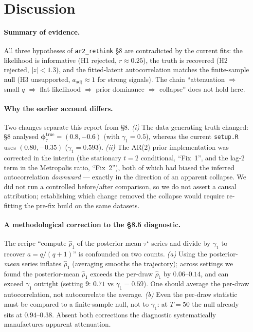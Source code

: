 \documentclass[11pt]{article}
\theoremstyle{definition}
\newcommand{\phitau}{\bm{\phi}_\tau}
\newcommand{\code}[1]{\texttt{#1}}
\begin{document}
\section{Discussion}
\label{sec:discussion}

\paragraph{Summary of evidence.} All three hypotheses of \code{ar2\_rethink}
\S8 are contradicted by the current fits: the likelihood is informative (H1
rejected, $r\approx0.25$), the truth is recovered (H2 rejected, $|z|<1.3$), and
the fitted-latent autocorrelation matches the finite-sample null (H3
unsupported, $a_{\text{adj}}\approx1$ for strong signals). The chain
``attenuation $\Rightarrow$ small $q$ $\Rightarrow$ flat likelihood
$\Rightarrow$ prior dominance $\Rightarrow$ collapse'' does not hold here.

\paragraph{Why the earlier account differs.} Two changes separate this report
from \S8. \emph{(i)} The data-generating truth changed: \S8 analysed
$\phitau^{\text{true}}=(0.8,-0.6)$ (with $\gamma_1=0.5$), whereas the current
\code{setup.R} uses $(0.80,-0.35)$ ($\gamma_1=0.593$). \emph{(ii)} The AR(2)
prior implementation was corrected in the interim (the stationary $t=2$
conditional, ``Fix~1'', and the lag-2 term in the Metropolis ratio, ``Fix~2''),
both of which had biased the inferred autocorrelation \emph{downward} --- exactly
in the direction of an apparent collapse. We did not run a controlled
before/after comparison, so we do not assert a causal attribution; establishing
which change removed the collapse would require re-fitting the pre-fix build on
the same datasets.

\paragraph{A methodological correction to the \S8.5 diagnostic.} The recipe
``compute $\hat\rho_1$ of the posterior-mean $\tau^\star$ series and divide by
$\gamma_1$ to recover $a=q/(q+1)$'' is confounded on two counts.
\emph{(a)} Using the posterior-\emph{mean} series inflates $\hat\rho_1$ (averaging
smooths the trajectory); across settings we found the posterior-mean $\hat\rho_1$
exceeds the per-draw $\hat\rho_1$ by $0.06$--$0.14$, and can exceed $\gamma_1$
outright (setting 9: $0.71$ vs $\gamma_1=0.59$). One should average the per-draw
autocorrelation, not autocorrelate the average. \emph{(b)} Even the per-draw
statistic must be compared to a finite-sample null, not to $\gamma_1$: at $T=50$
the null already sits at $0.94$--$0.38$. Absent both corrections the diagnostic
systematically manufactures apparent attenuation.
\end{document}
